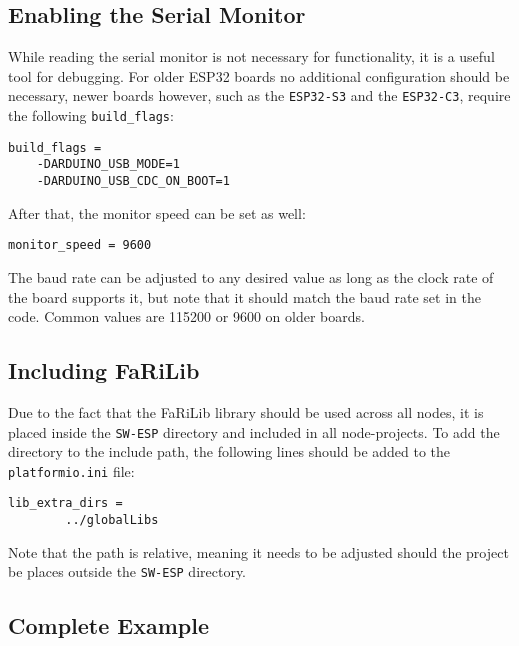    \subsection{Enabling the Serial Monitor}
    While reading the serial monitor is not necessary for functionality, it is a
    useful tool for debugging. For older ESP32 boards no additional configuration 
    should be necessary, newer boards however, such as the \texttt{ESP32-S3} and the 
    \texttt{ESP32-C3}, require the following \texttt{build\_flags}: 
    \begin{lstlisting}[style=cppCode]
    build_flags =
    -DARDUINO_USB_MODE=1
    -DARDUINO_USB_CDC_ON_BOOT=1
    \end{lstlisting}
    After that, the monitor speed can be set as well:
    \begin{lstlisting}[style=cppCode]
    monitor_speed = 9600
    \end{lstlisting}
    The baud rate can be adjusted to any desired value as long as the clock rate
    of the board supports it, but note that it should match the baud rate set in 
    the code. Common values are 115200 or 9600 on older boards.

    \subsection{Including FaRiLib} \label{sec:farilib_include}
    Due to the fact that the FaRiLib library should be used across all nodes, it is
    placed inside the \texttt{SW-ESP} directory and included in all node-projects.
    To add the directory to the include path, the following lines should be added to
    the \texttt{platformio.ini} file:
    \begin{lstlisting}[style=cppCode]
    lib_extra_dirs =
        ../globalLibs
    \end{lstlisting}
    Note that the path is relative, meaning it needs to be adjusted should the project
    be places outside the \texttt{SW-ESP} directory.

    \subsection{Complete Example}

